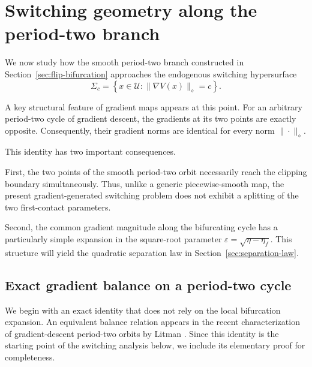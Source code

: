
\section{Switching geometry along the period-two branch}
\label{sec:switching-geometry}

We now study how the smooth period-two branch constructed in
Section~\ref{sec:flip-bifurcation} approaches the endogenous
switching hypersurface
\[
\Sigma_c
=
\left\{
x\in\mathcal U:
\|\nabla V(x)\|_\diamond=c
\right\}.
\]

A key structural feature of gradient maps appears at this point.
For an arbitrary period-two cycle of gradient descent, the gradients
at its two points are exactly opposite. Consequently, their gradient
norms are identical for every norm $\|\cdot\|_\diamond$.

This identity has two important consequences.

First, the two points of the smooth period-two orbit necessarily
reach the clipping boundary simultaneously. Thus, unlike a generic
piecewise-smooth map, the present gradient-generated switching
problem does not exhibit a splitting of the two first-contact
parameters.

Second, the common gradient magnitude along the bifurcating cycle
has a particularly simple expansion in the square-root parameter
$\varepsilon=\sqrt{\eta-\eta_f}$. This structure will yield the
quadratic separation law in Section~\ref{sec:separation-law}.

\subsection{Exact gradient balance on a period-two cycle}
\label{subsec:exact-gradient-balance}

We begin with an exact identity that does not rely on the local
bifurcation expansion. An equivalent balance relation appears in
the recent characterization of gradient-descent period-two orbits
by Litman \cite{Litman2026}. Since this identity is the starting
point of the switching analysis below, we include its elementary
proof for completeness.

